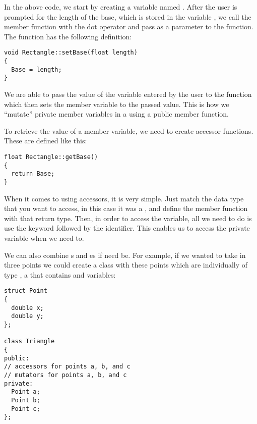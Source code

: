 In the above code, we start by creating a  variable named . 
After the user is prompted for the length of the base, which is stored in the variable , we call the  member function with the dot operator and pass  as a parameter to the function. 
The  function has the following definition:

\noindent\begin{minipage}{\linewidth}\begin{lstlisting}
void Rectangle::setBase(float length)
{
  Base = length;
}
\end{lstlisting}\end{minipage}

We are able to pass the value of the variable entered by the user to the  function which then sets the member variable  to the passed value. 
This is how we ``mutate'' private member variables in a  using a public member function. 

To retrieve the value of a member variable, we need to create accessor functions. 
These are defined like this: 

\noindent\begin{minipage}{\linewidth}\begin{lstlisting}
float Rectangle::getBase()
{
  return Base;
}
\end{lstlisting}\end{minipage}

When it comes to using accessors, it is very simple. 
Just match the data type that you want to access, in this case it was a , and define the member function with that return type. 
Then, in order to access the variable, all we need to do is use the keyword  followed by the identifier. 
This enables us to access the private variable when we need to. 


We can also combine s and es if need be. 
For example, if we wanted to take in three points we could create a  class with these points which are individually of type , a  that contains  and  variables:

\noindent\begin{minipage}{\linewidth}\begin{lstlisting}
struct Point
{
  double x;
  double y;
};
	
class Triangle
{
public:
// accessors for points a, b, and c
// mutators for points a, b, and c
private:
  Point a;
  Point b;
  Point c;
};
\end{lstlisting}\end{minipage}

